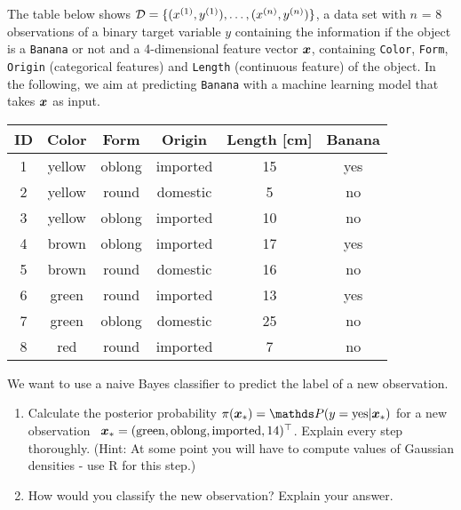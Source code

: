 \documentclass[a4paper]{article}
\newcounter{loes}
\begin{document}
{{The table below shows $\mathcal{D} = \{ (x^{(1)}, y^{(1)}), \ldots, (x^{(n)}, y^{(n)})\} $, a data set with 
$n$ = 8 observations of a binary target variable $y$ containing the information 
if the object is a \texttt{Banana} or not and a 4-dimensional feature vector 
$\bm{x}$, containing \texttt{Color}, \texttt{Form}, \texttt{Origin} (categorical 
features) and \texttt{Length} (continuous feature) of the object. In the 
following, we aim at predicting \texttt{Banana} with a machine learning model 
that takes $\bm{x}$ as input.

\begin{tabular}{ | c | c | c | c | c | c |}
\hline
ID  &  Color   &  Form    &  Origin    & Length [cm]  &  Banana  \\  \hline
1   &  yellow  &  oblong  &  imported  & 15           &  yes      \\
2   &  yellow  &  round   &  domestic  & 5            &  no       \\
3   &  yellow  &  oblong  &  imported  & 10           &  no       \\
4   &  brown   &  oblong  &  imported  & 17           &  yes      \\
5   &  brown   &  round   &  domestic  & 16           &  no        \\
6   &  green   &  round   &  imported  & 13           &  yes       \\
7   &  green   &  oblong  &  domestic  & 25           &  no       \\
8   &  red     &  round   &  imported  & 7            &  no        \\
\hline
\end{tabular}

We want to use a naive Bayes classifier to predict the label of a new 
observation. 

\begin{enumerate}
  \item Calculate the posterior probability $\pi(\xv_*) = \P(y = \text{yes} | 
  \xv_*)$ for a new observation \ $\bm{x}_* = (\text{green}, \text{oblong}, 
  \text{imported}, 14)^\top$. Explain every step thoroughly. (Hint: At some 
  point you will have to compute values of Gaussian densities - use R for this
  step.)
  \item How would you classify the new observation? Explain your answer.
\end{enumerate}

}

\dlz
\loesung{

\begin{enumerate}


\end{enumerate}}}
\end{document}
